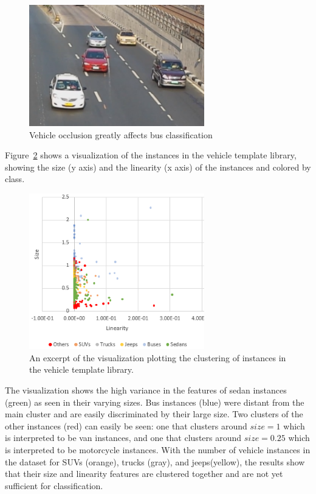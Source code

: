 \documentclass[conference]{IEEEtran}
\begin{document}
\begin{figure}[!ht]
\centering
\includegraphics[width=3in]{occlusion.png}
\caption{Vehicle occlusion greatly affects bus classification}
\label{fig_occlusion}
\end{figure}

Figure~\ref{fig_template_visualization} shows a visualization of the instances in the vehicle template library, showing the size (y axis) and the linearity (x axis) of the instances and colored by class. 

\begin{figure}[!ht]
\centering
\includegraphics[width=3in]{visualization_templates_4.png}
\caption{An excerpt of the visualization plotting the clustering of instances in the vehicle template library. }
\label{fig_template_visualization}
\end{figure}

The visualization shows the high variance in the features of sedan instances (green) as seen in their varying sizes. Bus instances (blue) were distant from the main cluster and are easily discriminated by their large size. Two clusters of the other instances (red) can easily be seen: one that clusters around $size = 1$ which is interpreted to be van instances, and one that clusters around $size = 0.25$ which is interpreted to be motorcycle instances. With the number of vehicle instances in the dataset for SUVs (orange), trucks (gray), and jeeps(yellow), the results show that their size and linearity features are clustered together and are not yet sufficient for classification.
\end{document}
